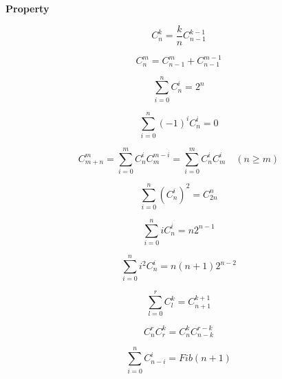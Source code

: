 \noindent\textbf{Property}

\begin{equation*}
C_n^k=\frac{k}{n} C_{n-1}^{k-1}
\end{equation*}

\begin{equation*}
C_n^m=C_{n-1}^m + C_{n-1}^{m-1}
\end{equation*}

\begin{equation*}
\sum_{i=0}^{n} C_n^i = 2^n
\end{equation*}

\begin{equation*}
\sum_{i=0}^{n} (-1)^i C_n^i = 0
\end{equation*}

\begin{equation*}
C_{m+n}^m=\sum_{i=0}^{m}C_n^iC_{m}^{m-i}=\sum_{i=0}^{m}C_{n}^iC_m^i \quad (n \ge m)
\end{equation*}

\begin{equation*}
\sum_{i=0}^n (C_n^i)^2 = C_{2n}^n
\end{equation*}

\begin{equation*}
\sum_{i=0}^n iC_n^i = n2^{n-1}
\end{equation*}

\begin{equation*}
\sum_{i=0}^n i^2C_n^i = n(n+1)2^{n-2}
\end{equation*}

\begin{equation*}
\sum_{l=0}^{r}C_l^k = C_{n+1}^{k+1}
\end{equation*}

\begin{equation*}
C_n^rC_r^k = C_n^kC_{n-k}^{r-k}
\end{equation*}

\begin{equation*}
\sum_{i=0}^{n} C_{n-i}^i = Fib(n+1)
\end{equation*}

